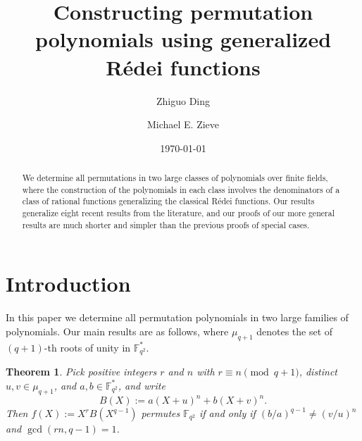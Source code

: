 \documentclass[11pt]{amsart}
\numberwithin{equation}{section}
\newtheorem{thm}[equation]{Theorem}
\theoremstyle{definition}
\newcommand{\F}{\mathbb{F}}
\begin{document}
\title[Permutation polynomials from R\'edei functions]
{Constructing permutation polynomials using generalized R\'edei functions}

\author{Zhiguo Ding}
\address{
  Hunan Institute of Traffic Engineering,
  Hengyang, Hunan 421001 China
}

\author{Michael E. Zieve}
\address{
  Department of Mathematics,
  University of Michigan,
  530 Church Street,
  Ann Arbor, MI 48109-1043 USA
}


\date{\today}

\begin{abstract}
We determine all permutations in two large classes of polynomials over finite fields, where the construction of the polynomials in each class involves the denominators of a class of rational functions generalizing the classical R\'edei functions.  Our results generalize eight recent results from the literature, and our proofs of our more general results are much shorter and simpler than the previous proofs of special cases.
\end{abstract}

\maketitle




\section{Introduction}

In this paper we determine all permutation polynomials in two large families of polynomials.  Our main results are as follows, where $\mu_{q+1}$ denotes the set of $(q+1)$-th roots of unity in $\F_{q^2}^*$.

\begin{thm}\label{main1}
Pick positive integers $r$ and $n$ with $r\equiv n \pmod {q+1}$, distinct $u,v\in\mu_{q+1}$, and $a,b\in \F_{q^2}^*$, and write
\[
B(X) := a (X+u)^n + b (X+v)^n.
\]
Then  $f(X):=X^r B(X^{q-1})$ permutes $\F_{q^2}$  if and only if $(b/a)^{q-1}\ne (v/u)^n$ and
$\gcd(rn,q-1)=1$.
\end{thm}
\end{document}
